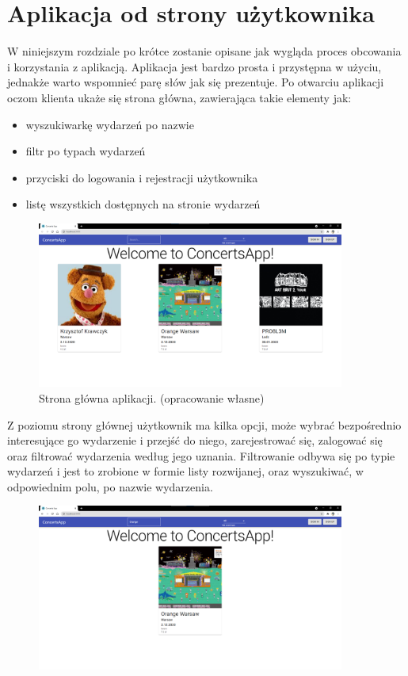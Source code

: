 \documentclass[12pt]{article}
\begin{document}
\begin{sloppypar}
\section{Aplikacja od strony użytkownika}
{
  W niniejszym rozdziale po krótce zostanie opisane jak wygląda proces obcowania i korzystania z aplikacją.
  Aplikacja jest bardzo prosta i przystępna w użyciu, jednakże warto wspomnieć parę słów jak się prezentuje.
  \bigbreak
  Po otwarciu aplikacji oczom klienta ukaże się strona główna, zawierająca takie elementy jak:
  \begin{itemize}
    \item wyszukiwarkę wydarzeń po nazwie
    \item filtr po typach wydarzeń
    \item przyciski do logowania i rejestracji użytkownika
    \item listę wszystkich dostępnych na stronie wydarzeń
  \end{itemize}
  \begin{figure}[H]
    \centering
    \includegraphics[width=0.9\textwidth]{client_app/home.png}
    \caption{Strona główna aplikacji. (opracowanie własne)}
    \label{fig:home-page}
  \end{figure}
  Z poziomu strony głównej użytkownik ma kilka opcji, może wybrać bezpośrednio interesujące go wydarzenie i przejść do niego, zarejestrować się, 
  zalogować się oraz filtrować wydarzenia według jego uznania. 
  Filtrowanie odbywa się po typie wydarzeń i jest to zrobione w formie listy rozwijanej, oraz wyszukiwać, w odpowiednim polu, po nazwie wydarzenia.
  \begin{figure}[H]
    \centering
    \includegraphics[width=0.9\textwidth]{client_app/search.png}

\end{figure}}
\end{sloppypar}
\end{document}
